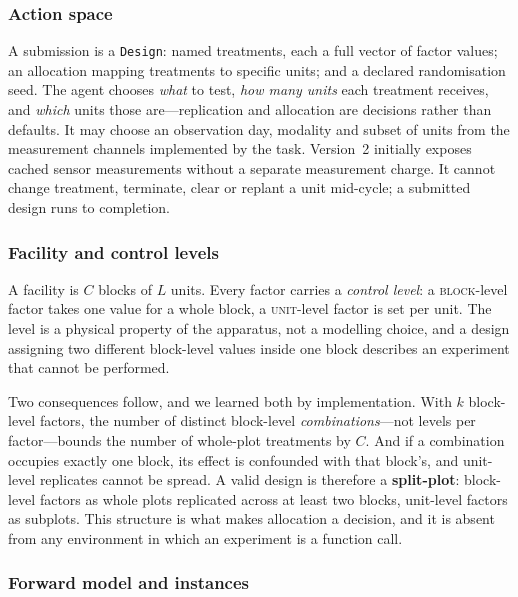 \subsubsection{Action space}
\label{sec:action}

A submission is a \texttt{Design}: named treatments, each a full vector of factor values; an
allocation mapping treatments to specific units; and a declared randomisation seed. The
agent chooses \emph{what} to test, \emph{how many units} each treatment receives, and
\emph{which} units those are---replication and allocation are decisions rather than
defaults. It may choose an observation day, modality and subset of units from the measurement
channels implemented by the task. Version~2 initially exposes cached sensor measurements
without a separate measurement charge. It cannot change treatment, terminate, clear or
replant a unit mid-cycle; a submitted design runs to completion.

\subsubsection{Facility and control levels}
\label{sec:facility}

A facility is $C$ blocks of $L$ units. Every factor carries a \emph{control level}: a
\textsc{block}-level factor takes one value for a whole block, a \textsc{unit}-level factor
is set per unit. The level is a physical property of the apparatus, not a modelling choice,
and a design assigning two different block-level values inside one block describes an
experiment that cannot be performed.

Two consequences follow, and we learned both by implementation. With $k$ block-level
factors, the number of distinct block-level \emph{combinations}---not levels per
factor---bounds the number of whole-plot treatments by $C$. And if a combination occupies
exactly one block, its effect is confounded with that block's, and unit-level replicates
cannot be spread. A valid design is therefore a \textbf{split-plot}: block-level factors as
whole plots replicated across at least two blocks, unit-level factors as subplots. This
structure is what makes allocation a decision, and it is absent from any environment in
which an experiment is a function call.

\subsubsection{Forward model and instances}
\label{sec:world}

